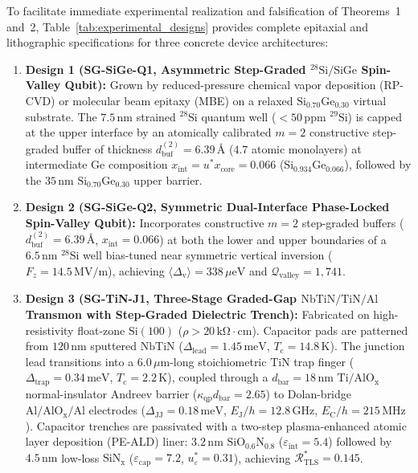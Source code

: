 \documentclass[11pt,letterpaper]{article}
\theoremstyle{definition}
\begin{document}
To facilitate immediate experimental realization and falsification of Theorems~1 and~2, Table~\ref{tab:experimental_designs} provides complete epitaxial and lithographic specifications for three concrete device architectures:
\begin{enumerate}
  \item \textbf{Design 1 (\textbf{SG-SiGe-Q1}, Asymmetric Step-Graded ${}^{28}\mathrm{Si}/\mathrm{SiGe}$ Spin-Valley Qubit):} Grown by reduced-pressure chemical vapor deposition (RP-CVD) or molecular beam epitaxy (MBE) on a relaxed $\mathrm{Si}_{0.70}\mathrm{Ge}_{0.30}$ virtual substrate. The $7.5\,\mathrm{nm}$ strained ${}^{28}\mathrm{Si}$ quantum well ($< 50\,\mathrm{ppm}$ ${}^{29}\mathrm{Si}$) is capped at the upper interface by an atomically calibrated $m=2$ constructive step-graded buffer of thickness $d_{\mathrm{buf}}^{(2)} = 6.39\,\text{\AA}$ ($4.7$ atomic monolayers) at intermediate Ge composition $x_{\mathrm{int}} = u^* x_{\mathrm{core}} = 0.066$ ($\mathrm{Si}_{0.934}\mathrm{Ge}_{0.066}$), followed by the $35\,\mathrm{nm}$ $\mathrm{Si}_{0.70}\mathrm{Ge}_{0.30}$ upper barrier.
  \item \textbf{Design 2 (\textbf{SG-SiGe-Q2}, Symmetric Dual-Interface Phase-Locked Spin-Valley Qubit):} Incorporates constructive $m=2$ step-graded buffers ($d_{\mathrm{buf}}^{(2)} = 6.39\,\text{\AA}$, $x_{\mathrm{int}} = 0.066$) at both the lower and upper boundaries of a $6.5\,\mathrm{nm}$ ${}^{28}\mathrm{Si}$ well bias-tuned near symmetric vertical inversion ($F_z = 14.5\,\mathrm{MV/m}$), achieving $\langle\Delta_{\mathrm{v}}\rangle = 338\,\mu\mathrm{eV}$ and $\mathcal{Q}_{\mathrm{valley}} = 1{,}741$.
  \item \textbf{Design 3 (\textbf{SG-TiN-J1}, Three-Stage Graded-Gap $\mathrm{NbTiN/TiN/Al}$ Transmon with Step-Graded Dielectric Trench):} Fabricated on high-resistivity float-zone $\mathrm{Si}(100)$ ($\rho > 20\,\mathrm{k\Omega\cdot cm}$). Capacitor pads are patterned from $120\,\mathrm{nm}$ sputtered $\mathrm{NbTiN}$ ($\Delta_{\mathrm{lead}} = 1.45\,\mathrm{meV}$, $T_{\mathrm{c}} = 14.8\,\mathrm{K}$). The junction lead transitions into a $6.0\,\mu\mathrm{m}$-long stoichiometric $\mathrm{TiN}$ trap finger ($\Delta_{\mathrm{trap}} = 0.34\,\mathrm{meV}$, $T_{\mathrm{c}} = 2.2\,\mathrm{K}$), coupled through a $d_{\mathrm{bar}} = 18\,\mathrm{nm}$ $\mathrm{Ti/AlO_x}$ normal-insulator Andreev barrier ($\kappa_{\mathrm{qp}} d_{\mathrm{bar}} = 2.65$) to Dolan-bridge $\mathrm{Al/AlO_x/Al}$ electrodes ($\Delta_{\mathrm{JJ}} = 0.18\,\mathrm{meV}$, $E_{\mathrm{J}}/h = 12.8\,\mathrm{GHz}$, $E_{\mathrm{C}}/h = 215\,\mathrm{MHz}$). Capacitor trenches are passivated with a two-step plasma-enhanced atomic layer deposition (PE-ALD) liner: $3.2\,\mathrm{nm}$ $\mathrm{SiO_{0.6}N_{0.8}}$ ($\varepsilon_{\mathrm{int}} = 5.4$) followed by $4.5\,\mathrm{nm}$ low-loss $\mathrm{SiN_x}$ ($\varepsilon_{\mathrm{cap}} = 7.2$, $u_\varepsilon^* = 0.31$), achieving $\mathcal{R}_{\mathrm{TLS}}^* = 0.145$.
\end{enumerate}
\end{document}
